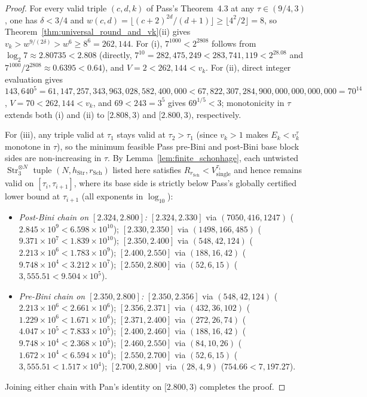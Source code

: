 \documentclass[11pt,a4paper]{article}
\theoremstyle{plain}
\theoremstyle{definition}
\theoremstyle{remark}
\DeclareMathOperator{\Str}{Str}
\begin{document}
\begin{proof}
For every valid triple $(c, d, k)$ of Pass's Theorem~4.3 at any $\tau \in (9/4, 3)$, one has $\delta < 3/4$ and $w(c, d) = \lfloor (c + 2)^{2d}/(d + 1)\rfloor \ge \lfloor 4^2/2\rfloor = 8$, so Theorem~\ref{thm:universal_round_and_vk}(ii) gives $v_k > w^{9/(2\delta)} > w^6 \ge 8^6 = 262{,}144$. For (i), $7^{1000} < 2^{2808}$ follows from $\log_2 7 \approx 2.80735 < 2.808$ (directly, $7^{10} = 282{,}475{,}249 < 283{,}741{,}119 < 2^{28.08}$ and $7^{1000}/2^{2808} \approx 0.6395 < 0.64$), and $V = 2 < 262{,}144 < v_k$. For (ii), direct integer evaluation gives $143{,}640^5 = 61{,}147{,}257{,}343{,}963{,}028{,}582{,}400{,}000 < 67{,}822{,}307{,}284{,}900{,}000{,}000{,}000{,}000 = 70^{14}$, $V = 70 < 262{,}144 < v_k$, and $69 < 243 = 3^5$ gives $69^{1/5} < 3$; monotonicity in $\tau$ extends both (i) and (ii) to $[2.808, 3)$ and $[2.800, 3)$, respectively.

For (iii), any triple valid at $\tau_1$ stays valid at $\tau_2 > \tau_1$ (since $v_k > 1$ makes $E_k < v_k^\tau$ monotone in $\tau$), so the minimum feasible Pass pre-Bini and post-Bini base block sides are non-increasing in $\tau$. By Lemma~\ref{lem:finite_schonhage}, each untwisted $\Str_3^{\otimes N}$ tuple $(N, h_{\mathrm{Str}}, r_{\mathrm{Sch}})$ listed here satisfies $R_{r_{\mathrm{Sch}}} < V_{\mathrm{single}}^{\tau_i}$ and hence remains valid on $[\tau_i, \tau_{i+1}]$, where its base side is strictly below Pass's globally certified lower bound at $\tau_{i+1}$ (all exponents in $\log_{10}$):
\begin{itemize}[nosep,leftmargin=1.5em]
\item \emph{Post-Bini chain on $[2.324, 2.800]$:}
$[2.324, 2.330]$ via $(7050, 416, 1247)$ ($2.845 \times 10^9 < 6.598 \times 10^{10}$);
$[2.330, 2.350]$ via $(1498, 166, 485)$ ($9.371 \times 10^7 < 1.839 \times 10^{10}$);
$[2.350, 2.400]$ via $(548, 42, 124)$ ($2.213 \times 10^6 < 1.783 \times 10^9$);
$[2.400, 2.550]$ via $(188, 16, 42)$ ($9.748 \times 10^4 < 3.212 \times 10^7$);
$[2.550, 2.800]$ via $(52, 6, 15)$ ($3{,}555.51 < 9.504 \times 10^5$).
\item \emph{Pre-Bini chain on $[2.350, 2.800]$:}
$[2.350, 2.356]$ via $(548, 42, 124)$ ($2.213 \times 10^6 < 2.661 \times 10^6$);
$[2.356, 2.371]$ via $(432, 36, 102)$ ($1.229 \times 10^6 < 1.671 \times 10^6$);
$[2.371, 2.400]$ via $(272, 26, 74)$ ($4.047 \times 10^5 < 7.833 \times 10^5$);
$[2.400, 2.460]$ via $(188, 16, 42)$ ($9.748 \times 10^4 < 2.368 \times 10^5$);
$[2.460, 2.550]$ via $(84, 10, 26)$ ($1.672 \times 10^4 < 6.594 \times 10^4$);
$[2.550, 2.700]$ via $(52, 6, 15)$ ($3{,}555.51 < 1.517 \times 10^4$);
$[2.700, 2.800]$ via $(28, 4, 9)$ ($754.66 < 7{,}197.27$).
\end{itemize}
Joining either chain with Pan's identity on $[2.800, 3)$ completes the proof.
\end{proof}
\end{document}
